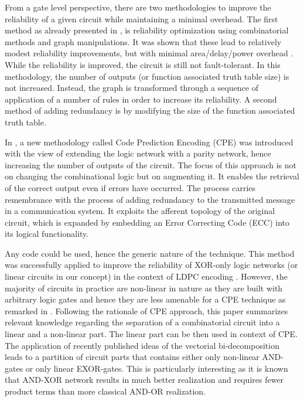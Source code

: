 \documentclass[a4paper]{article}
\begin{document}
From a gate level perspective, there are two methodologies to improve the reliability of a given circuit while maintaining a minimal overhead. The first method as already presented in \cite{Grandhi15}, is reliability optimization using combinatorial methods and graph manipulations. It was shown that these lead to relatively modest reliability improvements, but with minimal area/delay/power overhead \cite{Grandhi15}. 
While the reliability is improved, the circuit is still not fault-tolerant. In this methodology, the number of outputs (or function associated truth table size) is not increased. Instead, the graph is transformed through a sequence of application of a number of rules in order to increase its reliability. A second method of adding redundancy is by modifying the size of the function associated truth table. 

In \cite{D5.2, ETS}, a new methodology called Code Prediction Encoding (CPE) was introduced with the view of extending the logic network with a parity network, hence increasing the number of outputs of the circuit. The focus of this approach is not on changing the combinational logic but on augmenting it. It enables the retrieval of the correct output even if errors have occurred. The process carries remembrance with the process of adding redundancy to the transmitted message in a communication system. It exploits the afferent topology of the original circuit, which is expanded by embedding an Error Correcting Code (ECC) into its logical functionality. 

Any code could be used, hence the generic nature of the technique. This method was successfully applied to improve the reliability of XOR-only logic networks (or linear circuits in our concept) in the context of LDPC encoding 
\cite{ICC}. 
However, the majority of circuits in practice are non-linear in nature as they are built with arbitrary logic gates and hence they are less amenable for a CPE technique as remarked in \cite{D5.2}. 
Following the rationale of CPE approach, this paper summarizes relevant knowledge regarding the separation of a combinatorial circuit into a linear and a non-linear part. The linear part can be then used in context of CPE. The application of recently published ideas of the vectorial bi-decomposition \cite{S_VBD_LF_RM_2015} leads to a partition of circuit parts that contains either only non-linear AND-gates or only linear EXOR-gates. This is particularly interesting as it is known that AND-XOR network results in much better realization and requires fewer product terms than more classical AND-OR realization. 
 
\end{document}

